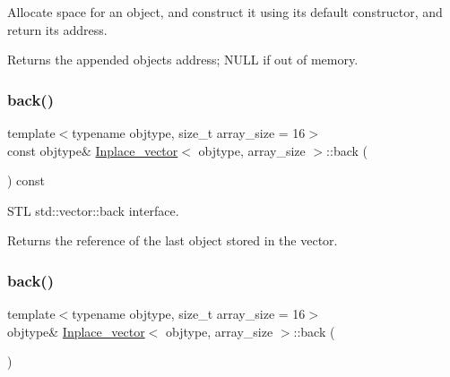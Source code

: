 Allocate space for an object, and construct it using its default constructor, and return its address. \begin{DoxyReturn}{Returns}
the appended object\textquotesingle{}s address; N\+U\+LL if out of memory. 
\end{DoxyReturn}
\mbox{\label{classInplace__vector_acf8cb3ab1ea491f3466c90be7db6cd25}} 
\subsubsection{\texorpdfstring{back()}{back()}\hspace{0.1cm}{\footnotesize\ttfamily [1/2]}}
{\footnotesize\ttfamily template$<$typename objtype, size\+\_\+t array\+\_\+size = 16$>$ \\
const objtype\& \mbox{\hyperlink{classInplace__vector}{Inplace\+\_\+vector}}$<$ objtype, array\+\_\+size $>$\+::back (\begin{DoxyParamCaption}{ }\end{DoxyParamCaption}) const\hspace{0.3cm}{\ttfamily [inline]}}

S\+TL std\+::vector\+::back interface. \begin{DoxyReturn}{Returns}
the reference of the last object stored in the vector. 
\end{DoxyReturn}
\mbox{\label{classInplace__vector_a1181edc4a42cd2200af2c30c8295a200}} 
\subsubsection{\texorpdfstring{back()}{back()}\hspace{0.1cm}{\footnotesize\ttfamily [2/2]}}
{\footnotesize\ttfamily template$<$typename objtype, size\+\_\+t array\+\_\+size = 16$>$ \\
objtype\& \mbox{\hyperlink{classInplace__vector}{Inplace\+\_\+vector}}$<$ objtype, array\+\_\+size $>$\+::back (\begin{DoxyParamCaption}{ }\end{DoxyParamCaption})\hspace{0.3cm}{\ttfamily [inline]}}

